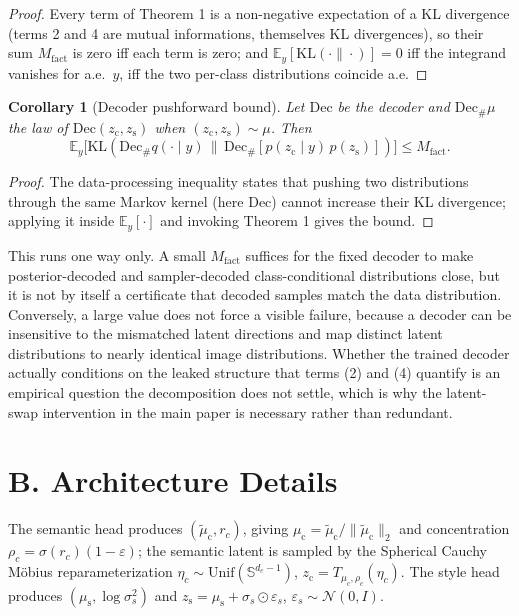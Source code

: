 \documentclass[letterpaper]{article}
\newtheorem{corollary}{Corollary}
\newcommand{\zc}{z_{\mathrm{c}}}
\newcommand{\zs}{z_{\mathrm{s}}}
\newcommand{\muc}{\mu_{\mathrm{c}}}
\newcommand{\mus}{\mu_{\mathrm{s}}}
\newcommand{\Sph}{\mathbb{S}}
\newcommand{\KL}{\mathrm{KL}}
\begin{document}
\begin{proof}
Every term of Theorem 1 is a non-negative expectation of a KL divergence
(terms 2 and 4 are mutual informations, themselves KL divergences), so their
sum $M_{\mathrm{fact}}$ is zero iff each term is zero; and $\mathbb
E_y[\KL(\cdot\|\cdot)]=0$ iff the integrand vanishes for a.e.\ $y$, iff the
two per-class distributions coincide a.e.
\end{proof}

\begin{corollary}[Decoder pushforward bound]
Let $\mathrm{Dec}$ be the decoder and $\mathrm{Dec}_\#\mu$ the law of
$\mathrm{Dec}(\zc,\zs)$ when $(\zc,\zs)\sim\mu$. Then
\[
\mathbb E_y\bigl[\KL(\mathrm{Dec}_\# q(\cdot\mid y)\,\|\,\mathrm{Dec}_\#[p(\zc\mid y)\,p(\zs)])\bigr] \le M_{\mathrm{fact}}.
\]
\end{corollary}

\begin{proof}
The data-processing inequality states that pushing two distributions through
the same Markov kernel (here $\mathrm{Dec}$) cannot increase their KL
divergence; applying it inside $\mathbb E_y[\cdot]$ and invoking Theorem 1
gives the bound.
\end{proof}

This runs one way only. A small $M_{\mathrm{fact}}$ suffices for the fixed
decoder to make posterior-decoded and sampler-decoded class-conditional
distributions close, but it is not by itself a certificate that decoded
samples match the data distribution. Conversely, a large value does not force
a visible failure, because a decoder can be insensitive to the mismatched
latent directions and map distinct latent distributions to nearly identical
image distributions. Whether the trained decoder actually conditions on the
leaked structure that terms (2) and (4) quantify is an empirical question the
decomposition does not settle, which is why the latent-swap intervention in
the main paper is necessary rather than redundant.

\section{B. Architecture Details}

The semantic head produces $(\tilde\muc,r_c)$, giving
$\muc=\tilde\muc/\|\tilde\muc\|_2$ and concentration
$\rho_c=\sigma(r_c)(1-\varepsilon)$; the semantic latent is sampled by the
Spherical Cauchy M\"obius reparameterization
$\eta_c\sim\mathrm{Unif}(\Sph^{d_c-1})$, $\zc=T_{\muc,\rho_c}(\eta_c)$. The
style head produces $(\mus,\log\sigma_s^2)$ and $\zs=\mus+\sigma_s\odot
\varepsilon_s$, $\varepsilon_s\sim\mathcal N(0,I)$.
\end{document}
